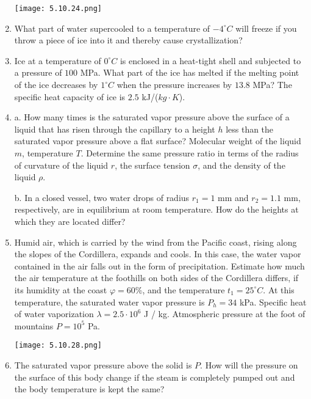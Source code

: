 \documentclass{article}
\begin{document}
\begin{enumerate}[label=5.10.\arabic*]
\begin{center}
    \texttt{[image: 5.10.24.png]}
\end{center}

\item What part of water supercooled to a temperature of $-4^\circ C$ will freeze if you throw a piece of ice into it and thereby cause crystallization?

\item Ice at a temperature of $0^\circ C$ is enclosed in a heat-tight shell and subjected to a pressure of $100$ MPa. What part of the ice has melted if the melting point of the ice decreases by $1^\circ C$ when the pressure increases by $13.8$ MPa? The specific heat capacity of ice is $2.5$ kJ/($kg \cdot K$).

\item a. How many times is the saturated vapor pressure above the surface of a liquid that has risen through the capillary to a height $h$ less than the saturated vapor pressure above a flat surface? Molecular weight of the liquid $m$, temperature $T$. Determine the same pressure ratio in terms of the radius of curvature of the liquid $r$, the surface tension $\sigma$, and the density of the liquid $\rho$. 

b. In a closed vessel, two water drops of radius $r_1 = 1$ mm and $r_2 = 1.1$ mm, respectively, are in equilibrium at room temperature. How do the heights at which they are located differ?

\item Humid air, which is carried by the wind from the Pacific coast, rising along the slopes of the Cordillera, expands and cools. In this case, the water vapor contained in the air falls out in the form of precipitation. Estimate how much the air temperature at the foothills on both sides of the Cordillera differs, if its humidity at the coast $\varphi = 60\%$, and the temperature $t_1 = 25^\circ C$. At this temperature, the saturated water vapor pressure is $P_h = 34$ kPa. Specific heat of water vaporization $\lambda = 2.5 \cdot 10^6$ J / kg. Atmospheric pressure at the foot of mountains $P = 10^5$ Pa.

\begin{center}
    \texttt{[image: 5.10.28.png]}
\end{center}

\item The saturated vapor pressure above the solid is $P$. How will the pressure on the surface of this body change if the steam is completely pumped out and the body temperature is kept the same?


\end{enumerate}
\end{document}
